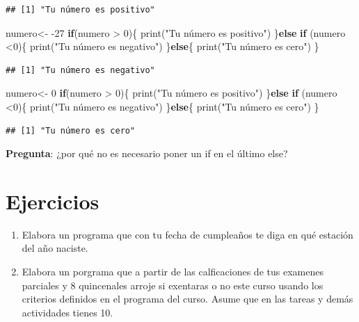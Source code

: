 \documentclass[
]{book}
\newenvironment{Shaded}{\begin{snugshade}}{\end{snugshade}}
\newcommand{\ControlFlowTok}[1]{\textcolor[rgb]{0.13,0.29,0.53}{\textbf{#1}}}
\newcommand{\DecValTok}[1]{\textcolor[rgb]{0.00,0.00,0.81}{#1}}
\newcommand{\FunctionTok}[1]{\textcolor[rgb]{0.00,0.00,0.00}{#1}}
\newcommand{\NormalTok}[1]{#1}
\newcommand{\OtherTok}[1]{\textcolor[rgb]{0.56,0.35,0.01}{#1}}
\newcommand{\SpecialCharTok}[1]{\textcolor[rgb]{0.00,0.00,0.00}{#1}}
\newcommand{\StringTok}[1]{\textcolor[rgb]{0.31,0.60,0.02}{#1}}
\begin{document}
\begin{verbatim}
## [1] "Tu número es positivo"
\end{verbatim}

\begin{Shaded}
\begin{Highlighting}[]
\NormalTok{numero}\OtherTok{\textless{}{-}} \SpecialCharTok{{-}}\DecValTok{27}
\ControlFlowTok{if}\NormalTok{(numero }\SpecialCharTok{\textgreater{}} \DecValTok{0}\NormalTok{)\{}
  \FunctionTok{print}\NormalTok{(}\StringTok{"Tu número es positivo"}\NormalTok{)}
\NormalTok{\}}\ControlFlowTok{else} \ControlFlowTok{if}\NormalTok{ (numero }\SpecialCharTok{\textless{}}\DecValTok{0}\NormalTok{)\{}
  \FunctionTok{print}\NormalTok{(}\StringTok{"Tu número es negativo"}\NormalTok{)}
\NormalTok{\}}\ControlFlowTok{else}\NormalTok{\{}
  \FunctionTok{print}\NormalTok{(}\StringTok{"Tu número es cero"}\NormalTok{)}
\NormalTok{\}}
\end{Highlighting}
\end{Shaded}

\begin{verbatim}
## [1] "Tu número es negativo"
\end{verbatim}

\begin{Shaded}
\begin{Highlighting}[]
\NormalTok{numero}\OtherTok{\textless{}{-}} \DecValTok{0}
\ControlFlowTok{if}\NormalTok{(numero }\SpecialCharTok{\textgreater{}} \DecValTok{0}\NormalTok{)\{}
  \FunctionTok{print}\NormalTok{(}\StringTok{"Tu número es positivo"}\NormalTok{)}
\NormalTok{\}}\ControlFlowTok{else} \ControlFlowTok{if}\NormalTok{ (numero }\SpecialCharTok{\textless{}}\DecValTok{0}\NormalTok{)\{}
  \FunctionTok{print}\NormalTok{(}\StringTok{"Tu número es negativo"}\NormalTok{)}
\NormalTok{\}}\ControlFlowTok{else}\NormalTok{\{}
  \FunctionTok{print}\NormalTok{(}\StringTok{"Tu número es cero"}\NormalTok{)}
\NormalTok{\}}
\end{Highlighting}
\end{Shaded}

\begin{verbatim}
## [1] "Tu número es cero"
\end{verbatim}

\textbf{Pregunta}: ¿por qué no es necesario poner un if en el último else?

\hypertarget{ejercicios-2}{%
\section{Ejercicios}\label{ejercicios-2}}

\begin{enumerate}
\def\labelenumi{\arabic{enumi}.}
\item
  Elabora un programa que con tu fecha de cumpleaños te diga en qué estación del año naciste.
\item
  Elabora un porgrama que a partir de las calficaciones de tus examenes parciales y 8 quincenales arroje si exentaras o no este curso usando los criterios definidos en el programa del curso. Asume que en las tareas y demás actividades tienes 10.
\end{enumerate}

  
\end{document}
